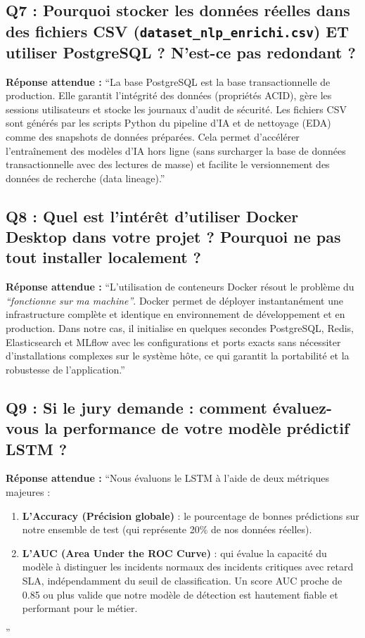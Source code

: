 \documentclass[11pt,a4paper]{article}
\begin{document}
\subsection*{Q7 : Pourquoi stocker les données réelles dans des fichiers CSV (\texttt{dataset\_nlp\_enrichi.csv}) ET utiliser PostgreSQL ? N'est-ce pas redondant ?}
\begin{responsebox}
\textbf{Réponse attendue :} ``La base PostgreSQL est la base transactionnelle de production. Elle garantit l'intégrité des données (propriétés ACID), gère les sessions utilisateurs et stocke les journaux d'audit de sécurité. Les fichiers CSV sont générés par les scripts Python du pipeline d'IA et de nettoyage (EDA) comme des snapshots de données préparées. Cela permet d'accélérer l'entraînement des modèles d'IA hors ligne (sans surcharger la base de données transactionnelle avec des lectures de masse) et facilite le versionnement des données de recherche (data lineage).''
\end{responsebox}

\subsection*{Q8 : Quel est l'intérêt d'utiliser Docker Desktop dans votre projet ? Pourquoi ne pas tout installer localement ?}
\begin{responsebox}
\textbf{Réponse attendue :} ``L'utilisation de conteneurs Docker résout le problème du \textit{``fonctionne sur ma machine''}. Docker permet de déployer instantanément une infrastructure complète et identique en environnement de développement et en production. Dans notre cas, il initialise en quelques secondes PostgreSQL, Redis, Elasticsearch et MLflow avec les configurations et ports exacts sans nécessiter d'installations complexes sur le système hôte, ce qui garantit la portabilité et la robustesse de l'application.''
\end{responsebox}

\subsection*{Q9 : Si le jury demande : comment évaluez-vous la performance de votre modèle prédictif LSTM ?}
\begin{responsebox}
\textbf{Réponse attendue :} ``Nous évaluons le LSTM à l'aide de deux métriques majeures :
\begin{enumerate}
    \item \textbf{L'Accuracy (Précision globale)} : le pourcentage de bonnes prédictions sur notre ensemble de test (qui représente 20\% de nos données réelles).
    \item \textbf{L'AUC (Area Under the ROC Curve)} : qui évalue la capacité du modèle à distinguer les incidents normaux des incidents critiques avec retard SLA, indépendamment du seuil de classification. Un score AUC proche de 0.85 ou plus valide que notre modèle de détection est hautement fiable et performant pour le métier.
\end{enumerate}''
\end{responsebox}
\end{document}
